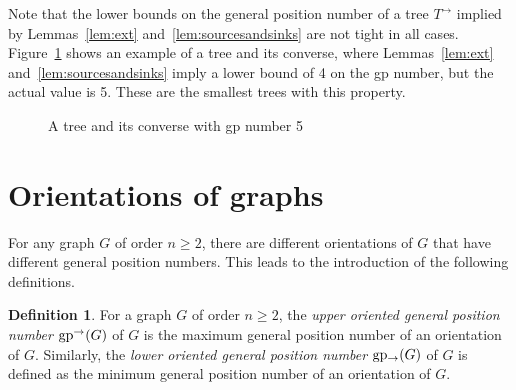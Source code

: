 \documentclass[a4paper,12pt]{article}
\theoremstyle{definition}
\newtheorem{definition}[theorem]{Definition}
\newcommand{\ugp}{{\rm gp^{\rightarrow }}}
\newcommand{\lgp}{{\rm gp_{\rightarrow }}}
\begin{document}
	Note that the lower bounds on the general position number of a tree $T^{\rightarrow}$ implied by Lemmas~\ref{lem:ext} and~\ref{lem:sourcesandsinks} are not tight in all cases. Figure~\ref{fig:tree7gp5} shows an example of a tree and its converse, where Lemmas~\ref{lem:ext} and~\ref{lem:sourcesandsinks} imply a lower bound of 4 on the gp number, but the actual value is 5. These are the smallest trees with this property.
	
	\begin{figure}
		\centering
{}

		\caption{A tree and its converse with gp number 5}
		\label{fig:tree7gp5}
	\end{figure}
	
	
	\section{Orientations of graphs}\label{sec:orientation}
	
	
	
	For any graph $G$ of order $n\geq 2$, there are different orientations of $G$ that have different general position numbers. This leads to the introduction of the following definitions.
	
	\begin{definition}
		For a graph $G$ of order $n \geq 2$, the \emph{upper oriented general position number} $\ugp(G)$ of $G$ is the maximum general position number of an orientation of $G$. Similarly, the \emph{lower oriented general position number} $\lgp(G)$ of $G$ is defined as the minimum general position number of an orientation of $G$. 
	\end{definition}
	
\end{document}
